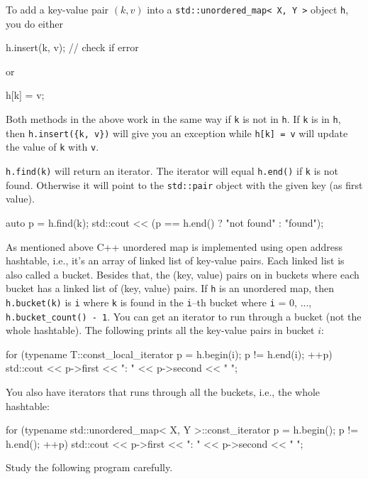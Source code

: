 To add a key-value pair $(k,v)$ into a
\verb!std::unordered_map< X, Y >! object \verb!h!, you do either
\begin{console}
h.insert({k, v}); // check if error
\end{console}
or
\begin{console}
h[k] = v;
\end{console}
Both methods in the above work in the same way if \verb!k! is not in \verb!h!.
If \verb!k! is in \verb!h!, then
\verb!h.insert({k, v})! will give you an exception
while
\verb!h[k] = v! will update the value of \verb!k! with \verb!v!.

\verb!h.find(k)! will return an iterator.
The iterator will equal \verb!h.end()! if \verb!k! is not found.
Otherwise it will point to the
\verb!std::pair! object with the given key (as first value).
\begin{console}
auto p = h.find(k);
std::cout << (p == h.end() ? "not found\n" : "found\n");  
\end{console}

As mentioned above C++ unordered map is implemented using open address hashtable,
i.e., it's an array of linked list of key-value pairs.
Each linked list is also called a bucket.
Besides that, the (key, value) pairs on in buckets
where each bucket has a linked list of (key, value) pairs.
If \verb!h! is an unordered map,
then \verb!h.bucket(k)! is \verb!i! where
\verb!k! is found in the \verb!i!--th bucket
where \verb!i! = 0, ..., \verb!h.bucket_count() - 1!.
You can get an iterator to run through a bucket (not the whole hashtable).
The following prints all the key-value pairs in bucket $i$:
\begin{console}
for (typename T::const_local_iterator p = h.begin(i);
     p != h.end(i); ++p)
{
    std::cout << p->first << ": " << p->second << "  ";
}
\end{console}

You also have iterators that runs through all the buckets, i.e., the whole hashtable:
\begin{console}[fontsize=\footnotesize]
for (typename std::unordered_map< X, Y >::const_iterator p = h.begin();
     p != h.end(); ++p)
{
    std::cout << p->first << ": " << p->second << "  ";
}
\end{console}

Study the following program carefully.


\vspace{-0.1cm}
{\small
{}
}

